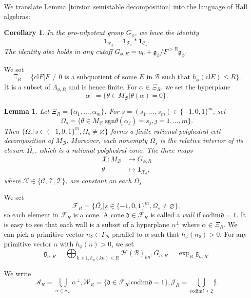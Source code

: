 \documentclass[a4paper,12pt]{amsart}
\numberwithin{equation}{section}
\newtheorem{lemma}[theorem]{Lemma}
\newtheorem{corollary}[theorem]{Corollary}
\newcommand{\sgn}{\mathrm{sgn}}
\newcommand{\codim}{\mathrm{codim}}
\newcommand{\cl}{\mathrm{cl}}
\newcommand{\1}{\mathbf{1}}
\begin{document}
We translate Lemma \ref{torsion semistable decomposition} into the language of Hall algebras:
\begin{corollary}\label{torsion semistable decomposition, hall}
    In the pro-nilpotent group $G_\phi$, we have the identity
    \[\1_{\overline{\mathcal{T}}_\theta}=\1_{\mathcal{T}_\theta}*\1_{\mathcal{C}_\theta}.\]
    The identity also holds in any cutoff $G_{\phi,R}=u_0+\mathfrak{g}_\phi/F^{>R}\mathfrak{g}_\phi$.
\end{corollary}
We set
\[\Xi_R=\{\cl F| F\neq 0\text{ is a subquotient of some $E$ in $\mathcal{B}$ such that }h_\phi(\cl E)\leqslant R\}.\]
It is a subset of $\Lambda_{\phi,R}$ and is hence finite. For $\alpha\in\Xi_R$, we set the hyperplane
\[\alpha^\perp=\{\theta\in M_\mathcal{B}|\theta(\alpha)=0\}.\]
\begin{lemma}\label{polyhedral cell decomposition}
    Let $\Xi_R=\{\alpha_1,\dots,\alpha_m\}$. For
$s=(s_1,\dots,s_m)\in\{-1,0,1\}^m$, set
\[\Omega_s=\{\theta\in M_\mathcal{B}|\sgn\theta(\alpha_j)=s_j,j=1,\dots,m\}.\]
Then $\{\Omega_s|s\in\{-1,0,1\}^m,\Omega_s\neq\varnothing\}$ forms a finite rational polyhedral cell decomposition of $M_\mathcal{B}$. Moreover, each nonempty $\Omega_s$ is the relative interior of its closure $\overline{\Omega_s}$, which is a rational polyhedral cone. The three maps
\begin{align*}
    \mathcal{X}:M_\mathcal{B}&\rightarrow G_{\phi,R}\\
    \theta&\mapsto\1_{\mathcal{X}_\theta},
\end{align*}
where $\mathcal{X}\in\{\mathcal{C},\mathcal{T},\overline{\mathcal{T}}\}$, are constant on each $\Omega_s$.
\end{lemma}
We set
\[\mathcal{F}_R=\{\overline{\Omega_s}|s\in\{-1,0,1\}^m,\Omega_s\neq\varnothing\},\]
so each element in $\mathcal{F}_R$ is a cone. A cone $\mathfrak{d}\in\mathcal{F}_R$ is called a \emph{wall} if $\codim\mathfrak{d}=1$. It is easy to see that each wall is a subset of a hyperplane $\alpha^\perp$ where $\alpha\in\Xi_R$. We can pick a primitive vector $n_{\mathfrak{d}}\in\Gamma_\mathcal{B}$ parallel to $\alpha$ such that $h_\phi(n_{\mathfrak{d}})>0$. For any primitive vector $n$ with $h_\phi(n)>0$, we set
\[\mathfrak{g}_{n,R}=\bigoplus_{k\geqslant1,h_\phi(kn)\leqslant R}\mathcal{H}(\mathcal{B})_{kn},G_{n,R}=\exp_R\mathfrak{g}_{n,R}.\]

We write
\[\mathcal{A}_R=\bigcup_{\alpha\in\Xi_R}\alpha^\perp,\mathcal{W}_R=\{\mathfrak{d}\in\mathcal{F}_R|\codim\mathfrak{d}=1\},\mathcal{J}_R=\bigcup_{\codim\mathfrak{f}\geqslant2}\mathfrak{f}.\]
\end{document}
